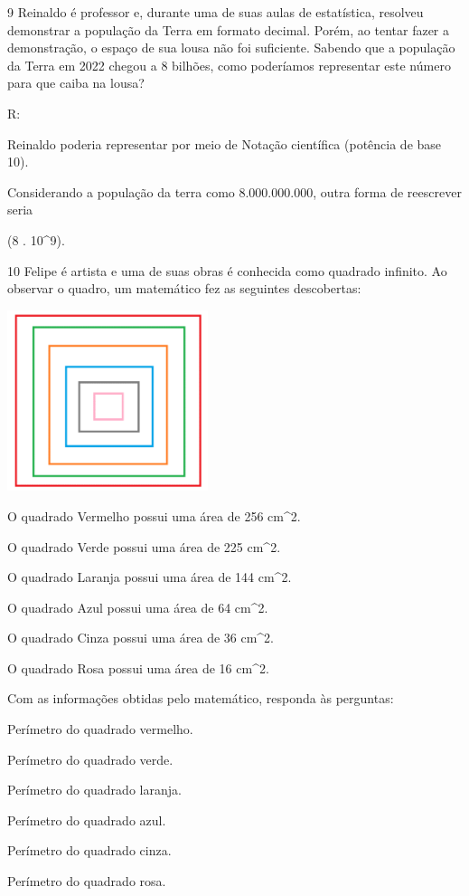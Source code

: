 \num{9} Reinaldo é professor e, durante uma de suas aulas de estatística,
resolveu demonstrar a população da Terra em formato decimal. Porém, ao
tentar fazer a demonstração, o espaço de sua lousa não foi suficiente.
Sabendo que a população da Terra em 2022 chegou a 8 bilhões, como
poderíamos representar este número para que caiba na lousa?

R:

Reinaldo poderia representar por meio de Notação científica (potência de
base 10).

Considerando a população da terra como 8.000.000.000, outra forma de
reescrever seria

(8 . 10^9).

\num{10} Felipe é artista e uma de suas obras é conhecida como quadrado
infinito. Ao observar o quadro, um matemático fez as seguintes
descobertas:

\includegraphics[width=2.3125in,height=2.07917in]{./imgSAEB_8_MAT/media/image2.png}

O quadrado Vermelho possui uma área de 256 cm^2.

O quadrado Verde possui uma área de 225 cm^2.

O quadrado Laranja possui uma área de 144 cm^2.

O quadrado Azul possui uma área de 64 cm^2.

O quadrado Cinza possui uma área de 36 cm^2.

O quadrado Rosa possui uma área de 16 cm^2.

Com as informações obtidas pelo matemático, responda às perguntas:
\item Perímetro do quadrado vermelho.
\item Perímetro do quadrado verde.
\item Perímetro do quadrado laranja.
\item Perímetro do quadrado azul.
\item Perímetro do quadrado cinza.
\item Perímetro do quadrado rosa.

